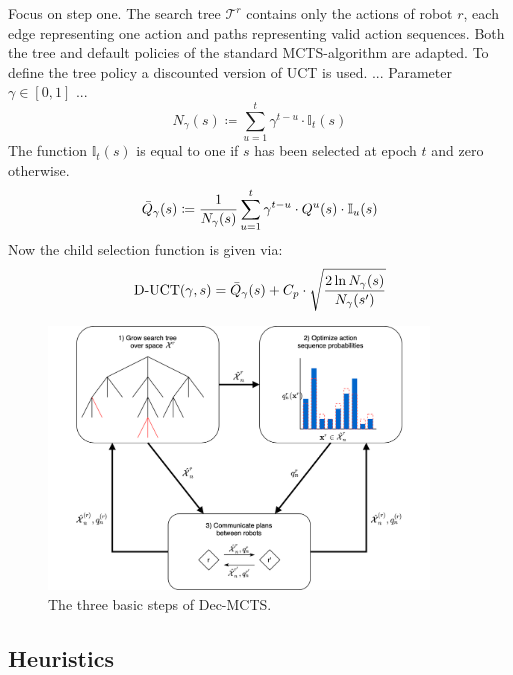 Focus on step one. The search tree $\mathcal{T}^r$ contains only the actions of robot $r$, each edge representing one action and paths representing valid action sequences. Both the tree and default policies of the standard MCTS-algorithm are adapted. To define the tree policy a discounted version of UCT is used. ...
Parameter $\gamma \in [0,1]$ ...
\begin{equation*}
    N_\gamma(s) \coloneqq \sum_{u = 1}^t \gamma^{t-u} \cdot \mathbb{I}_t(s)
\end{equation*}
The function $\mathbb{I}_t(s)$ is equal to one if $s$ has been selected at epoch $t$ and zero otherwise.
\begin{equation*}
    \Bar{Q}_\gamma(s) \coloneqq \frac{1}{N_\gamma(s)}\sum_{u = 1}^t  \gamma^{t-u} \cdot Q^u(s) \cdot \mathbb{I}_u(s)
\end{equation*}
Now the child selection function is given via:
\begin{equation*}
    \text{D-UCT}(\gamma,s) =  \Bar{Q}_\gamma(s) + C_p \cdot \sqrt{\frac{2 \ln N_\gamma(s)}{N_\gamma(s')}}
\end{equation*}

\begin{figure}
    \centering
    \includegraphics[width=0.9\textwidth]{img/dec-mcts.png}
    \caption{The three basic steps of Dec-MCTS.}
    \label{fig:dec_mcts}
\end{figure}
\subsection{Heuristics}
\label{ss:heuristics}
